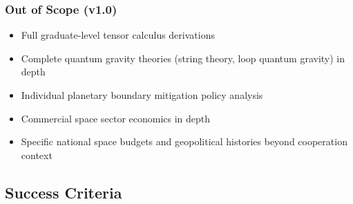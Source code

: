 \documentclass[11pt,letterpaper]{article}
\begin{document}
\subsubsection*{Out of Scope (v1.0)}
\begin{itemize}[noitemsep]
\item Full graduate-level tensor calculus derivations
\item Complete quantum gravity theories (string theory, loop quantum gravity) in depth
\item Individual planetary boundary mitigation policy analysis
\item Commercial space sector economics in depth
\item Specific national space budgets and geopolitical histories beyond cooperation context
\end{itemize}

\subsection{Success Criteria}
\end{document}
